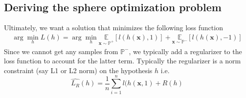 \documentclass[11pt]{report}
\begin{document}
\subsection{Deriving the sphere optimization problem}
Ultimately, we want a solution that minimizes the following loss function
\begin{align}
    \arg\!\min_h L(h) 
    = \arg\!\min_h \mathbb{E}\limits_{\boldsymbol{x} \sim \mathbb{P}^+} \left[ l(h(\boldsymbol{x}), 1) \right] + \mathbb{E}\limits_{\boldsymbol{x} \sim \mathbb{P}^-} \left[ l(h(\boldsymbol{x}), -1) \right]
\end{align}
Since we cannot get any samples from $\mathbb{P^-}$, we typically add a regularizer to the loss function to account for the latter term. Typically the regularizer is a norm constraint (say L1 or L2 norm) on the hypothesis $h$ i.e.
$$\hat{L_R}(h) = \frac{1}{n}\sum _{i=1} ^n l(h(\boldsymbol{x}, 1) + R(h)$$
\end{document}
